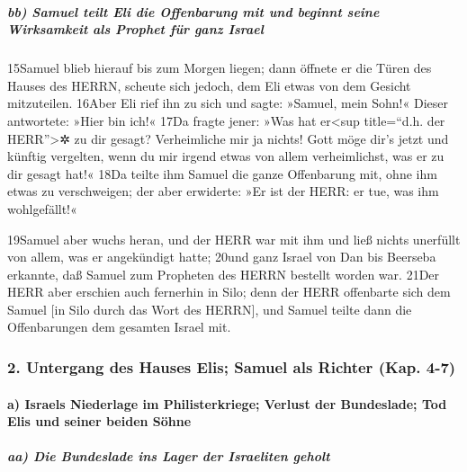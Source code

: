 \hypertarget{bb-samuel-teilt-eli-die-offenbarung-mit-und-beginnt-seine-wirksamkeit-als-prophet-fuxfcr-ganz-israel}{%
\subparagraph{bb) Samuel teilt Eli die Offenbarung mit und beginnt seine
Wirksamkeit als Prophet für ganz
Israel}\label{bb-samuel-teilt-eli-die-offenbarung-mit-und-beginnt-seine-wirksamkeit-als-prophet-fuxfcr-ganz-israel}}

15Samuel blieb hierauf bis zum Morgen liegen; dann öffnete er die Türen
des Hauses des HERRN, scheute sich jedoch, dem Eli etwas von dem Gesicht
mitzuteilen. 16Aber Eli rief ihn zu sich und sagte: »Samuel, mein Sohn!«
Dieser antwortete: »Hier bin ich!« 17Da fragte jener: »Was hat
er\textless sup title=``d.h. der HERR''\textgreater✲ zu dir gesagt?
Verheimliche mir ja nichts! Gott möge dir's jetzt und künftig vergelten,
wenn du mir irgend etwas von allem verheimlichst, was er zu dir gesagt
hat!« 18Da teilte ihm Samuel die ganze Offenbarung mit, ohne ihm etwas
zu verschweigen; der aber erwiderte: »Er ist der HERR: er tue, was ihm
wohlgefällt!«

19Samuel aber wuchs heran, und der HERR war mit ihm und ließ nichts
unerfüllt von allem, was er angekündigt hatte; 20und ganz Israel von Dan
bis Beerseba erkannte, daß Samuel zum Propheten des HERRN bestellt
worden war. 21Der HERR aber erschien auch fernerhin in Silo; denn der
HERR offenbarte sich dem Samuel {[}in Silo durch das Wort des HERRN{]},
und Samuel teilte dann die Offenbarungen dem gesamten Israel mit.

\hypertarget{untergang-des-hauses-elis-samuel-als-richter-kap.-4-7}{%
\subsubsection{2. Untergang des Hauses Elis; Samuel als Richter (Kap.
4-7)}\label{untergang-des-hauses-elis-samuel-als-richter-kap.-4-7}}

\hypertarget{a-israels-niederlage-im-philisterkriege-verlust-der-bundeslade-tod-elis-und-seiner-beiden-suxf6hne}{%
\paragraph{a) Israels Niederlage im Philisterkriege; Verlust der
Bundeslade; Tod Elis und seiner beiden
Söhne}\label{a-israels-niederlage-im-philisterkriege-verlust-der-bundeslade-tod-elis-und-seiner-beiden-suxf6hne}}

\hypertarget{aa-die-bundeslade-ins-lager-der-israeliten-geholt}{%
\subparagraph{aa) Die Bundeslade ins Lager der Israeliten
geholt}\label{aa-die-bundeslade-ins-lager-der-israeliten-geholt}}

